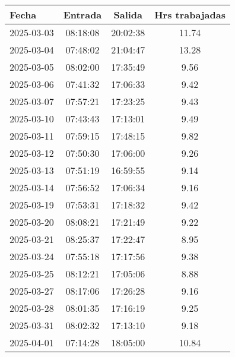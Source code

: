 \documentclass[11pt,a4paper]{article}
\newcommand{\mejoradatabla}[1]{
  \renewcommand{\arraystretch}{1.3}
  \setlength{\tabcolsep}{10pt}
  #1
  \renewcommand{\arraystretch}{1}
  \setlength{\tabcolsep}{6pt}
}
\begin{document}
\begin{minipage}[t]{0.62\textwidth}
\mejoradatabla{
\begin{tabular}{lccc}
\toprule
\rowcolor{grisclaro} \textbf{Fecha} & \textbf{Entrada} & \textbf{Salida} & \textbf{Hrs trabajadas}\\
\midrule

2025-03-03 & 08:18:08 & 20:02:38 & 11.74\\

2025-03-04 & 07:48:02 & 21:04:47 & 13.28\\

2025-03-05 & 08:02:00 & 17:35:49 & 9.56\\

2025-03-06 & 07:41:32 & 17:06:33 & 9.42\\

2025-03-07 & 07:57:21 & 17:23:25 & 9.43\\

2025-03-10 & 07:43:43 & 17:13:01 & 9.49\\

2025-03-11 & 07:59:15 & 17:48:15 & 9.82\\

2025-03-12 & 07:50:30 & 17:06:00 & 9.26\\

2025-03-13 & 07:51:19 & 16:59:55 & 9.14\\

2025-03-14 & 07:56:52 & 17:06:34 & 9.16\\

2025-03-19 & 07:53:31 & 17:18:32 & 9.42\\

2025-03-20 & 08:08:21 & 17:21:49 & 9.22\\

2025-03-21 & 08:25:37 & 17:22:47 & 8.95\\

2025-03-24 & 07:55:18 & 17:17:56 & 9.38\\

2025-03-25 & 08:12:21 & 17:05:06 & 8.88\\

2025-03-27 & 08:17:06 & 17:26:28 & 9.16\\

2025-03-28 & 08:01:35 & 17:16:19 & 9.25\\

2025-03-31 & 08:02:32 & 17:13:10 & 9.18\\

2025-04-01 & 07:14:28 & 18:05:00 & 10.84\\

\bottomrule
\end{tabular}
}
\end{minipage}
\end{document}
